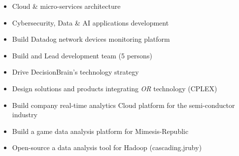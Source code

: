 \documentclass[10pt,a4paper,ragged2e,withhyper]{altacv}
\begin{document}
	\begin{paracol}{2}
	\begin{itemize}
		\item Cloud \& micro-services architecture
		\item Cybersecurity, Data \& AI applications development
	\end{itemize}
	
		
		
		\divider
		
		
		\begin{itemize}
			\item Build Datadog  network devices monitoring platform
			\item Build and Lead development team (5 persons)
		\end{itemize}
	
		
		\divider
		
		\begin{itemize}
			\item Drive DecisionBrain’s technology strategy
			\item Design solutions and products integrating \textit{OR} technology (CPLEX)
		\end{itemize}	
			
		\divider
		
		\begin{itemize}
			\item Build company real-time analytics Cloud platform 
		 for the semi-conductor industry
		\end{itemize}	
		
		\divider
			
		\begin{itemize}
			\item Build a game data analysis platform for Mimesis-Republic
			\item Open-source a data analysis tool for Hadoop (cascading.jruby)
		\end{itemize}
		

\end{paracol}
\end{document}
